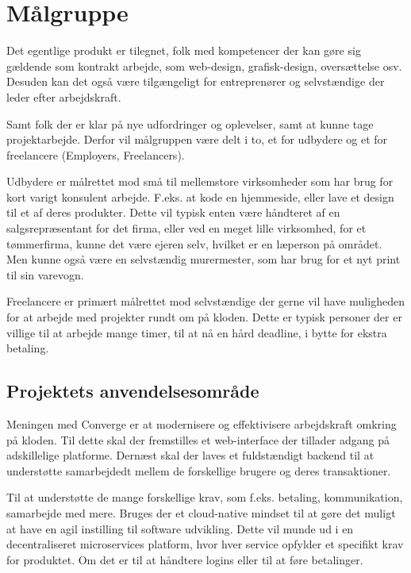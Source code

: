 \chapter{Målgruppe}

Det egentlige produkt er tilegnet, folk med kompetencer der kan gøre sig gældende som kontrakt arbejde, som web-design, grafisk-design, oversættelse osv. Desuden kan det også være tilgængeligt for entreprenører og selvstændige der leder efter arbejdskraft.

Samt folk der er klar på nye udfordringer og oplevelser, samt at kunne tage projektarbejde. Derfor vil målgruppen være delt i to, et for udbydere og et for freelancere (Employers, Freelancers).

Udbydere er målrettet mod små til mellemstore virksomheder som har brug for kort varigt konsulent arbejde. F.eks. at kode en hjemmeside, eller lave et design til et af deres produkter. Dette vil typisk enten være håndteret af en salgsrepræsentant for det firma, eller ved en meget lille virksomhed, for et tømmerfirma, kunne det være ejeren selv, hvilket er en læperson på området. Men kunne også være en selvstændig murermester, som har brug for et nyt print til sin varevogn.

Freelancere er primært målrettet mod selvstændige der gerne vil have muligheden for at arbejde med projekter rundt om på kloden. Dette er typisk personer der er villige til at arbejde mange timer, til at nå en hård deadline, i bytte for ekstra betaling.

\section{Projektets anvendelsesområde}

Meningen med Converge er at modernisere og effektivisere arbejdskraft omkring på kloden. Til dette skal der fremstilles et web-interface der tillader adgang på adskillelige platforme. Dernæst skal der laves et fuldstændigt backend til at understøtte samarbejdedt mellem de forskellige brugere og deres transaktioner.

Til at understøtte de mange forskellige krav, som f.eks. betaling, kommunikation, samarbejde med mere. Bruges der et cloud-native mindset til at gøre det muligt at have en agil instilling til software udvikling. Dette vil munde ud i en decentraliseret microservices platform, hvor hver service opfylder et specifikt krav for produktet. Om det er til at håndtere logins eller til at føre betalinger.

